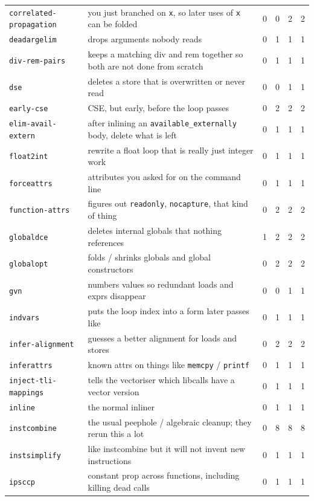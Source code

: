 \documentclass[11pt,a4paper]{article}
\begin{document}
{\begin{longtable}{lp{5.6cm}rrrr}
\texttt{correlated-propagation} & you just branched on \texttt{x}, so later uses of \texttt{x} can be folded & 0 & 0 & 2 & 2 \\
\texttt{deadargelim} & drops arguments nobody reads & 0 & 1 & 1 & 1 \\
\texttt{div-rem-pairs} & keeps a matching div and rem together so both are not done from scratch & 0 & 1 & 1 & 1 \\
\texttt{dse} & deletes a store that is overwritten or never read & 0 & 0 & 1 & 1 \\
\texttt{early-cse} & CSE, but early, before the loop passes & 0 & 2 & 2 & 2 \\
\texttt{elim-avail-extern} & after inlining an \texttt{available\_externally} body, delete what is left & 0 & 1 & 1 & 1 \\
\texttt{float2int} & rewrite a float loop that is really just integer work & 0 & 1 & 1 & 1 \\
\texttt{forceattrs} & attributes you asked for on the command line & 0 & 1 & 1 & 1 \\
\texttt{function-attrs} & figures out \texttt{readonly}, \texttt{nocapture}, that kind of thing & 0 & 2 & 2 & 2 \\
\texttt{globaldce} & deletes internal globals that nothing references & 1 & 2 & 2 & 2 \\
\texttt{globalopt} & folds / shrinks globals and global constructors & 0 & 2 & 2 & 2 \\
\texttt{gvn} & numbers values so redundant loads and exprs disappear & 0 & 0 & 1 & 1 \\
\texttt{indvars} & puts the loop index into a form later passes like & 0 & 1 & 1 & 1 \\
\texttt{infer-alignment} & guesses a better alignment for loads and stores & 0 & 2 & 2 & 2 \\
\texttt{inferattrs} & known attrs on things like \texttt{memcpy} / \texttt{printf} & 0 & 1 & 1 & 1 \\
\texttt{inject-tli-mappings} & tells the vectoriser which libcalls have a vector version & 0 & 1 & 1 & 1 \\
\texttt{inline} & the normal inliner & 0 & 1 & 1 & 1 \\
\texttt{instcombine} & the usual peephole / algebraic cleanup; they rerun this a lot & 0 & 8 & 8 & 8 \\
\texttt{instsimplify} & like instcombine but it will not invent new instructions & 0 & 1 & 1 & 1 \\
\texttt{ipsccp} & constant prop across functions, including killing dead calls & 0 & 1 & 1 & 1 \\

\end{longtable}}
\end{document}
